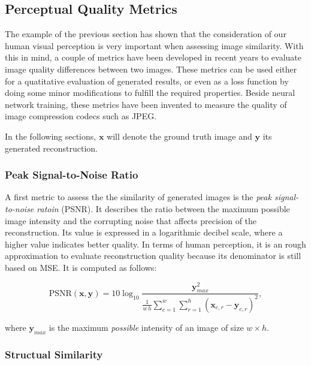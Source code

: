 \subsection{Perceptual Quality Metrics}

The example of the previous section has shown that the consideration of our human visual perception is very important when assessing image similarity. With this in mind, a couple of metrics have been developed in recent years to evaluate image quality differences between two images. These metrics can be used either for a quatitative evaluation of generated results, or even as a loss function by doing some minor modifications to fulfill the required properties. Beside neural network training, these metrics have been invented to measure the quality of image compression codecs such as JPEG.

In the following sections, $ \textbf{x} $ will denote the ground truth image and $ \textbf{y} $ its generated reconstruction.

\subsubsection*{Peak Signal-to-Noise Ratio}

A first metric to assess the the similarity of generated images is the \textit{peak signal-to-noise ratoin} (PSNR). It describes the ratio between the maximum possible image intensity and the corrupting noise that affects precision of the reconstruction. Its value is expressed in a logarithmic decibel scale, where a higher value indicates better quality. In terms of human perception, it is an rough approximation to evaluate reconstruction quality because its denominator is still based on MSE. It is computed as follows:

\begin{equation} \label{eq:psnr}
\textrm{PSNR}(\textbf{x}, \textbf{y}) = 10 \log_{10} \frac{\textbf{y}_{max}^2}{\frac{1}{w \, h} \sum_{c=1}^{w} \sum_{r=1}^{h} (\textbf{x}_{c,r} - \textbf{y}_{c,r})^2 } ,
\end{equation}

where $ \textbf{y}_{max} $ is the maximum \textit{possible} intensity of an image of size $ w \times h $.


\subsubsection*{Structual Similarity}

